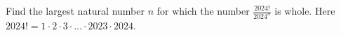 Find the largest natural number $n$ for which the number 
$\displaystyle\frac{2024!}{2024^{n}} $
is whole. Here $2024!=1 \cdot 2 \cdot 3 \cdot \ldots \cdot 2023 \cdot 2024$. 
